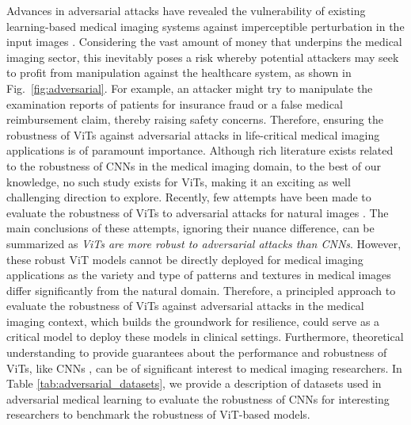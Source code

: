 \documentclass[10pt,journal,compsoc]{IEEEtran}
\begin{document}
Advances in adversarial attacks have revealed the vulnerability of existing learning-based medical imaging systems against imperceptible perturbation in the input images \cite{ma2021understanding,papangelou2018toward,finlayson2019adversarial}. Considering the vast amount of money that underpins the medical imaging sector, this inevitably poses a risk whereby potential attackers may seek to profit from manipulation against the healthcare system, as shown in Fig.~\ref{fig:adversarial}. For example, an attacker might try to manipulate the examination reports of patients for insurance fraud or a false medical reimbursement claim, thereby raising safety concerns.
Therefore, ensuring the robustness of ViTs against adversarial attacks in life-critical medical imaging applications is of paramount importance. Although rich literature exists related to the robustness of CNNs in the medical imaging domain, to the best of our knowledge, no such study exists for ViTs, making it an exciting as well challenging direction to explore. Recently, few attempts have been made to evaluate the robustness of ViTs to adversarial attacks for natural images \cite{benz2021adversarial,bhojanapalli2021understanding,wei2021towards,shao2021adversarial,paul2021vision,naseer2021improving,mao2021rethinking,mahmood2021robustness,joshi2021adversarial,aldahdooh2021reveal}. The main conclusions of these attempts, ignoring their nuance difference, can be summarized as \textit{ViTs are more robust to adversarial attacks than CNNs}. However, these robust ViT models cannot be directly deployed for medical imaging applications as the variety and type of patterns and textures in medical images differ significantly from the natural domain. Therefore, a principled approach to evaluate the robustness of ViTs against adversarial attacks in the medical imaging context, which builds the groundwork for resilience, could serve as a critical model to deploy these models in clinical settings. Furthermore, theoretical understanding to provide guarantees about the performance and robustness of ViTs, like CNNs \cite{katz2017towards}, can be of significant interest to medical imaging researchers. In Table \ref{tab:adversarial_datasets}, we provide a description of datasets used in adversarial medical learning to evaluate the robustness of CNNs for interesting researchers to benchmark the robustness of ViT-based models.
\end{document}
